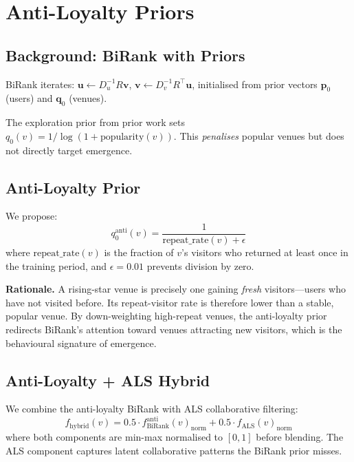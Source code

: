 \documentclass{article}
\begin{document}
\section{Anti-Loyalty Priors}
\label{sec:method}

\subsection{Background: BiRank with Priors}

BiRank iterates:
$\mathbf{u} \leftarrow D_u^{-1} R \mathbf{v}$,\;
$\mathbf{v} \leftarrow D_v^{-1} R^\top \mathbf{u}$,
initialised from prior vectors $\mathbf{p}_0$ (users) and $\mathbf{q}_0$
(venues).

The exploration prior from prior work sets
$q_0(v) = 1 / \log(1 + \text{popularity}(v))$.
This \emph{penalises} popular venues but does not directly target emergence.

\subsection{Anti-Loyalty Prior}

We propose:
\begin{equation}
  q_0^{\text{anti}}(v) = \frac{1}{\text{repeat\_rate}(v) + \epsilon}
  \label{eq:anti_loyalty}
\end{equation}
where $\text{repeat\_rate}(v)$ is the fraction of $v$'s visitors who
returned at least once in the training period, and $\epsilon = 0.01$
prevents division by zero.

\textbf{Rationale.}
A rising-star venue is precisely one gaining \emph{fresh} visitors---users
who have not visited before.
Its repeat-visitor rate is therefore lower than a stable, popular venue.
By down-weighting high-repeat venues, the anti-loyalty prior redirects
BiRank's attention toward venues attracting new visitors, which is the
behavioural signature of emergence.

\subsection{Anti-Loyalty + ALS Hybrid}

We combine the anti-loyalty BiRank with ALS collaborative filtering:
\begin{equation}
  f_{\text{hybrid}}(v) = 0.5 \cdot f_{\text{BiRank}}^{\text{anti}}(v)_{\text{norm}}
                       + 0.5 \cdot f_{\text{ALS}}(v)_{\text{norm}}
\end{equation}
where both components are min-max normalised to $[0, 1]$ before blending.
The ALS component captures latent collaborative patterns the BiRank prior misses.
\end{document}
